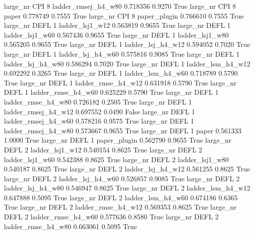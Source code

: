   large_nr      CPI                 8 ladder_rmsej_h4_w80   0.718356      0.9270    True
  large_nr      CPI                 8               paper   0.778749      0.7555    True
  large_nr      CPI                 8        paper_plugin   0.766610      0.7555    True
  large_nr     DEFL                 1     ladder_lsj1_w12   0.563819      0.9655    True
  large_nr     DEFL                 1     ladder_lsj1_w60   0.567436      0.9655    True
  large_nr     DEFL                 1     ladder_lsj1_w80   0.565205      0.9655    True
  large_nr     DEFL                 1   ladder_lsj_h4_w12   0.594052      0.7020    True
  large_nr     DEFL                 1   ladder_lsj_h4_w60   0.575816      0.9085    True
  large_nr     DEFL                 1   ladder_lsj_h4_w80   0.586294      0.7020    True
  large_nr     DEFL                 1   ladder_lsm_h4_w12   0.692292      0.3265    True
  large_nr     DEFL                 1   ladder_lsm_h4_w60   0.718789      0.5790    True
  large_nr     DEFL                 1  ladder_rmse_h4_w12   0.631918      0.5790    True
  large_nr     DEFL                 1  ladder_rmse_h4_w60   0.625229      0.5790    True
  large_nr     DEFL                 1  ladder_rmse_h4_w80   0.726182      0.2505    True
  large_nr     DEFL                 1 ladder_rmsej_h4_w12   0.697552      0.0490   False
  large_nr     DEFL                 1 ladder_rmsej_h4_w60   0.578216      0.9575    True
  large_nr     DEFL                 1 ladder_rmsej_h4_w80   0.573667      0.9655    True
  large_nr     DEFL                 1               paper   0.561333      1.0000    True
  large_nr     DEFL                 1        paper_plugin   0.562790      0.9655    True
  large_nr     DEFL                 2     ladder_lsj1_w12   0.540154      0.8625    True
  large_nr     DEFL                 2     ladder_lsj1_w60   0.542388      0.8625    True
  large_nr     DEFL                 2     ladder_lsj1_w80   0.540187      0.8625    True
  large_nr     DEFL                 2   ladder_lsj_h4_w12   0.561255      0.8625    True
  large_nr     DEFL                 2   ladder_lsj_h4_w60   0.526857      0.9085    True
  large_nr     DEFL                 2   ladder_lsj_h4_w80   0.546947      0.8625    True
  large_nr     DEFL                 2   ladder_lsm_h4_w12   0.647888      0.5095    True
  large_nr     DEFL                 2   ladder_lsm_h4_w60   0.674186      0.6365    True
  large_nr     DEFL                 2  ladder_rmse_h4_w12   0.569353      0.8625    True
  large_nr     DEFL                 2  ladder_rmse_h4_w60   0.577636      0.8580    True
  large_nr     DEFL                 2  ladder_rmse_h4_w80   0.663061      0.5095    True
